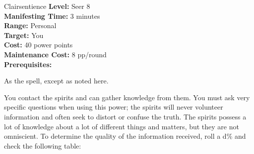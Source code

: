 {Clairsentience}
{
	\textbf{Level:}
	Seer 8\\
	\textbf{Manifesting Time:}
	3 minutes\\
	\textbf{Range:}
	Personal\\
	\textbf{Target:}
	You\\
	\textbf{Cost:}
	40 power points\\
	\textbf{Maintenance Cost:}
	8 pp/round\\
	\textbf{Prerequisites:}
	\\
}
{
	As the  spell, except as noted here.

	You contact the spirits and can gather knowledge from them.	You must ask very specific questions when using this power; the spirits will never volunteer information and often seek to distort or confuse the truth. The spirits possess a lot of knowledge about a lot of different things and matters, but they are not omniscient. To determine the quality of the information received, roll a d\% and check the following table:

}